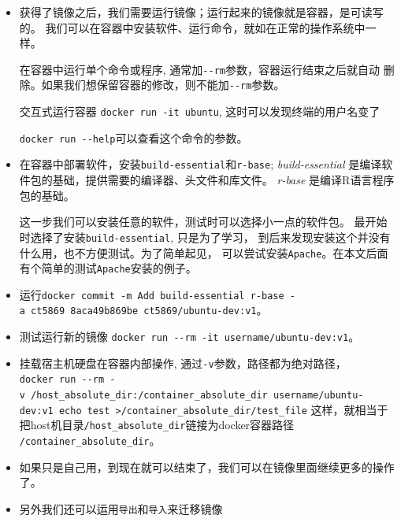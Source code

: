 \documentclass[]{article}
\numberwithin{figure}{section}
\numberwithin{table}{section}
\begin{document}
\begin{itemize}
\item
  获得了镜像之后，我们需要运行镜像；运行起来的镜像就是容器，是可读写的。
  我们可以在容器中安装软件、运行命令，就如在正常的操作系统中一样。

  在容器中运行单个命令或程序, 通常加\texttt{-\/-rm}参数，容器运行结束之后就自动
  删除。如果我们想保留容器的修改，则不能加\texttt{-\/-rm}参数。

  交互式运行容器 \texttt{docker\ run\ -it\ ubuntu}, 这时可以发现终端的用户名变了

  \texttt{docker\ run\ -\/-help}可以查看这个命令的参数。
\item
  在容器中部署软件，安装\texttt{build-essential}和\texttt{r-base};
  \emph{build-essential} 是编译软件包的基础，提供需要的编译器、头文件和库文件。
  \emph{r-base} 是编译R语言程序包的基础。

  这一步我们可以安装任意的软件，测试时可以选择小一点的软件包。
  最开始时选择了安装\texttt{build-essential}, 只是为了学习，
  到后来发现安装这个并没有什么用，也不方便测试。为了简单起见，
  可以尝试安装\texttt{Apache}。在本文后面有个简单的测试\texttt{Apache}安装的例子。
\item
  运行\texttt{docker\ commit\ -m\ \textquotesingle{}Add\ build-essential\ r-base\textquotesingle{}\ -a\ ct5869\ 8aca49b869be\ ct5869/ubuntu-dev:v1\textquotesingle{}\textquotesingle{}}。
\item
  测试运行新的镜像 \texttt{docker\ run\ -\/-rm\ -it\ username/ubuntu-dev:v1}。
\item
  挂载宿主机硬盘在容器内部操作, 通过\texttt{-v}参数，路径都为绝对路径，
  \texttt{docker\ run\ -\/-rm\ -v\ /host\_absolute\_dir:/container\_absolute\_dir\ username/ubuntu-dev:v1\ echo\ \textquotesingle{}test\textquotesingle{}\ \textgreater{}/container\_absolute\_dir/test\_file}
  这样，就相当于把host机目录\texttt{/host\_absolute\_dir}链接为docker容器路径
  \texttt{/container\_absolute\_dir}。
\item
  如果只是自己用，到现在就可以结束了，我们可以在镜像里面继续更多的操作了。
\item
  另外我们还可以运用\texttt{导出}和\texttt{导入}来迁移镜像


\end{itemize}
\end{document}
